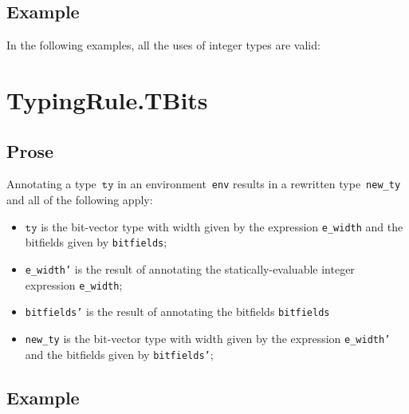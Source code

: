 \documentclass{book}
\newcommand\tty[0]{\texttt{ty}}
\begin{document}
\begin{itemize}
\subsection{Example}

In the following examples, all the uses of integer types are valid:





\section{TypingRule.TBits \label{sec:TypingRule.TBits}}

\subsection{Prose}
Annotating a type~$\tty$ in an environment~\texttt{env} results in a
rewritten type~\texttt{new\_ty} and all of the following apply:
\begin{itemize}
  \item $\tty$ is the bit-vector type with width given by the expression
    \texttt{e\_width} and the bitfields given by \texttt{bitfields};
  \item \texttt{e\_width'} is the result of annotating the statically-evaluable integer expression \texttt{e\_width};
  \item \texttt{bitfields'} is the result of annotating the bitfields \texttt{bitfields}
  \item \texttt{new\_ty} is the bit-vector type with width given by the expression
    \texttt{e\_width'} and the bitfields given by \texttt{bitfields'};
\end{itemize}

\subsection{Example}




\end{itemize}
\end{document}
